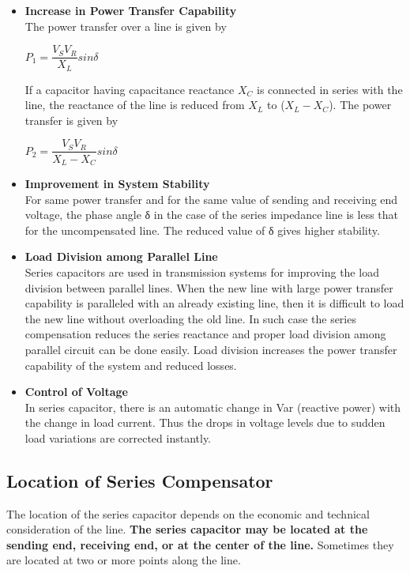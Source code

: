 \documentclass[12pt]{article}
\begin{document}
    \begin{itemize}
      \item {\bf Increase in Power Transfer Capability}\\ The power transfer over a line is given by
      \begin{center}
        $ P_1 = \dfrac{V_S V_R}{X_L} sin \delta $
      \end{center}
      If a capacitor having capacitance reactance $X_C$ is connected in series with the line, 
      the reactance of the line is reduced from $X_L$ to ($X_L - X_C$). The power transfer is given by
      \begin{center}
        $ P_2 = \dfrac{V_S V_R}{X_L - X_C} sin \delta $
      \end{center}

      \item {\bf Improvement in System Stability}\\ For same power transfer and for the same value 
      of sending and receiving end voltage, the phase angle δ in the case of the series impedance 
      line is less that for the uncompensated line. The reduced value of δ gives higher stability.

      \item {\bf Load Division among Parallel Line}\\ Series capacitors are used in transmission 
      systems for improving the load division between parallel lines. When the new line with large 
      power transfer capability is paralleled with an already existing line, then it is difficult 
      to load the new line without overloading  the old line. In such case the series compensation 
      reduces the series reactance and proper load division among parallel circuit can be done 
      easily. Load division increases the power transfer capability of the system and reduced losses.

      \item {\bf Control of Voltage}\\ In series capacitor, there is an automatic change in Var 
      (reactive power) with the change in load current. Thus the drops in voltage levels due to sudden 
      load variations are corrected instantly.
    \end{itemize}

    \subsection{Location of Series Compensator}
    The location of the series capacitor depends on the economic and technical consideration of the 
    line. {\bf The series capacitor may be located at the sending end, receiving end, or at the center of 
    the line.} Sometimes they are located at two or more points along the line.
\end{document}
